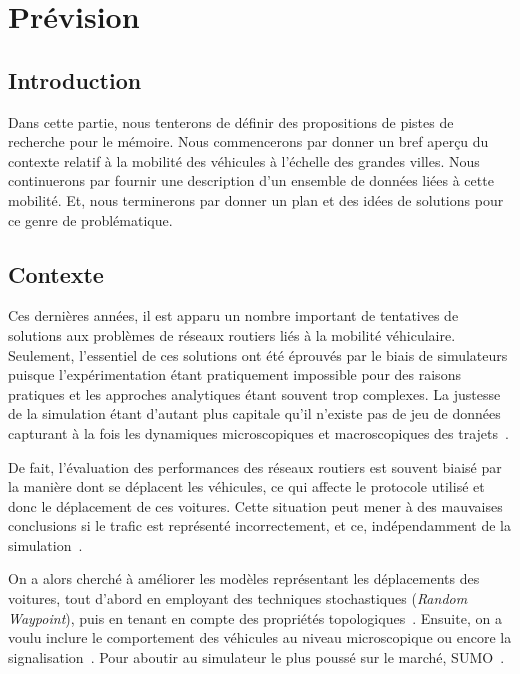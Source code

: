 \chapter{Prévision}

\section{Introduction}

Dans cette partie, nous tenterons de définir des propositions de pistes de recherche pour le mémoire. Nous commencerons par donner un bref aperçu du contexte relatif à la mobilité des véhicules à l'échelle des grandes villes. Nous continuerons par fournir une description d'un ensemble de données liées à cette mobilité. Et, nous terminerons par donner un plan et des idées de solutions pour ce genre de problématique.

\section{Contexte}

Ces dernières années, il est apparu un nombre important de tentatives de solutions aux problèmes de réseaux routiers liés à la mobilité véhiculaire. Seulement, l'essentiel de ces solutions ont été éprouvés par le biais de simulateurs puisque l'expérimentation étant pratiquement impossible pour des raisons pratiques et les approches analytiques étant souvent trop complexes. La justesse de la simulation étant d'autant plus capitale qu'il n'existe pas de jeu de données capturant à la fois les dynamiques microscopiques et macroscopiques des trajets~\cite{uppoor2014generation}.

De fait, l'évaluation des performances des réseaux routiers est souvent biaisé par la manière dont se déplacent les véhicules, ce qui affecte le protocole utilisé et donc le déplacement de ces voitures. Cette situation peut mener à des mauvaises conclusions si le trafic est représenté incorrectement, et ce, indépendamment de la simulation~\cite{bai2003important}.

On a alors cherché à améliorer les modèles représentant les déplacements des voitures, tout d'abord en employant des techniques stochastiques (\textit{Random Waypoint}), puis en tenant en compte des propriétés topologiques~\cite{saha2004modeling}. Ensuite, on a voulu inclure le comportement des véhicules au niveau microscopique ou encore la signalisation~\cite{harri2009mobility}. Pour aboutir au simulateur le plus poussé sur le marché, SUMO~\cite{SUMO2012}.

